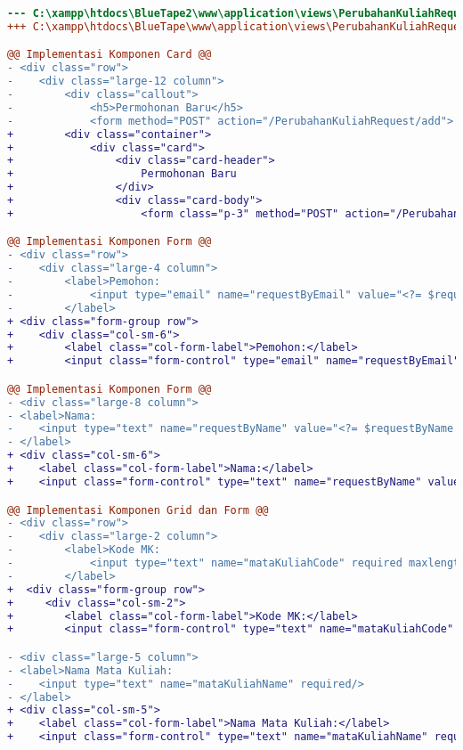 \begin{lstlisting}[language=diff, caption=Kode untuk Halaman Perubahan Kuliah Request, label=Entri, basicstyle=\ttfamily, frame=single,
columns=fullflexible, keepspaces=true, breaklines=true]
--- C:\xampp\htdocs\BlueTape2\www\application\views\PerubahanKuliahRequest\main.php
+++ C:\xampp\htdocs\BlueTape\www\application\views\PerubahanKuliahRequest\main.php

@@ Implementasi Komponen Card @@
- <div class="row">
-    <div class="large-12 column">
-        <div class="callout">
-            <h5>Permohonan Baru</h5>
-            <form method="POST" action="/PerubahanKuliahRequest/add">
+        <div class="container">
+            <div class="card">
+                <div class="card-header">
+                    Permohonan Baru
+                </div>
+                <div class="card-body">
+                    <form class="p-3" method="POST" action="/PerubahanKuliahRequest/add">

@@ Implementasi Komponen Form @@
- <div class="row">
-    <div class="large-4 column">
-        <label>Pemohon:
-            <input type="email" name="requestByEmail" value="<?= $requestByEmail ?>" readonly="readonly"/>
-        </label>
+ <div class="form-group row">
+    <div class="col-sm-6">
+        <label class="col-form-label">Pemohon:</label>
+        <input class="form-control" type="email" name="requestByEmail" value="<?= $requestByEmail ?>" 

@@ Implementasi Komponen Form @@
- <div class="large-8 column">
- <label>Nama:
-    <input type="text" name="requestByName" value="<?= $requestByName ?>" readonly="readonly"/>
- </label>
+ <div class="col-sm-6">
+    <label class="col-form-label">Nama:</label>
+    <input class="form-control" type="text" name="requestByName" value="<?= $requestByName ?>" readonly="readonly"/>

@@ Implementasi Komponen Grid dan Form @@
- <div class="row">
-    <div class="large-2 column">
-        <label>Kode MK:
-            <input type="text" name="mataKuliahCode" required maxlength="9" pattern="[A-Z]{3}[0-9]{3}([0-9]{3})?" title="Kode MK dalam format XYZ123"/>
-        </label>
+  <div class="form-group row">
+     <div class="col-sm-2">
+        <label class="col-form-label">Kode MK:</label>
+        <input class="form-control" type="text" name="mataKuliahCode" required maxlength="9" pattern="[A-Z]{3}[0-9]{3}([0-9]{3})?" title="Kode MK dalam format XYZ123"/>

- <div class="large-5 column">
- <label>Nama Mata Kuliah:
-    <input type="text" name="mataKuliahName" required/>
- </label>
+ <div class="col-sm-5">
+    <label class="col-form-label">Nama Mata Kuliah:</label>
+    <input class="form-control" type="text" name="mataKuliahName" required/>


\end{lstlisting}
